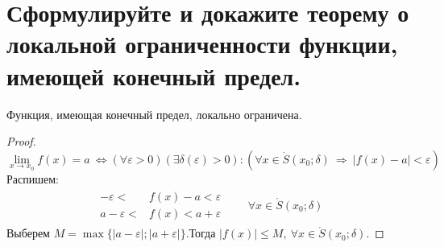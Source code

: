 \section{Сформулируйте и докажите теорему о локальной ограниченности функции, имеющей конечный предел.}
\begin{theorem}
  Функция, имеющая конечный предел, локально ограничена.
\end{theorem}
\begin{proof} 
  \[
    \lim_{x \to x_0} f(x) = a\ \iff (\forall \varepsilon > 0)(\exists \delta(\varepsilon) > 0)\colon (\forall x \in \mathring{S}(x_0; \delta)\ \Rightarrow\ |f(x) - a| < \varepsilon)
  \]
  Распишем: \vspace{-\topsep}
  \begin{gather*}
    \begin{aligned}
      - \varepsilon < &f(x) - a < \varepsilon \\
      a - \varepsilon < &f(x) < a + \varepsilon
    \end{aligned}\qquad \forall  x \in \mathring{S}(x_0; \delta)
  \end{gather*}
  Выберем $M = \max \{|a - \varepsilon|; |a + \varepsilon|\}$.\quad Тогда $|f(x)| \le  M,\ \forall  x \in  \mathring{S}(x_0; \delta)$.
\end{proof}

